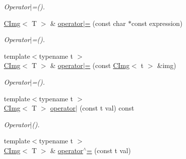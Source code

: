 \begin{DoxyCompactItemize}
\begin{DoxyCompactList}\small\item\em Operator$|$=(). \item\end{DoxyCompactList}\item 
\hypertarget{structcimg__library_1_1CImg_ac742c9e0fcef4bfef80bc8f781ad09fb}{
\hyperlink{structcimg__library_1_1CImg}{CImg}$<$ T $>$ \& \hyperlink{structcimg__library_1_1CImg_ac742c9e0fcef4bfef80bc8f781ad09fb}{operator$|$=} (const char $\ast$const expression)}
\label{structcimg__library_1_1CImg_ac742c9e0fcef4bfef80bc8f781ad09fb}

\begin{DoxyCompactList}\small\item\em Operator$|$=(). \item\end{DoxyCompactList}\item 
\hypertarget{structcimg__library_1_1CImg_a6306b063ce03ecf392a03cac541375af}{
{\footnotesize template$<$typename t $>$ }\\\hyperlink{structcimg__library_1_1CImg}{CImg}$<$ T $>$ \& \hyperlink{structcimg__library_1_1CImg_a6306b063ce03ecf392a03cac541375af}{operator$|$=} (const \hyperlink{structcimg__library_1_1CImg}{CImg}$<$ t $>$ \&img)}
\label{structcimg__library_1_1CImg_a6306b063ce03ecf392a03cac541375af}

\begin{DoxyCompactList}\small\item\em Operator$|$=(). \item\end{DoxyCompactList}\item 
\hypertarget{structcimg__library_1_1CImg_a2f09e5e6e7495d8515ea22806eeae6b2}{
{\footnotesize template$<$typename t $>$ }\\\hyperlink{structcimg__library_1_1CImg}{CImg}$<$ T $>$ \hyperlink{structcimg__library_1_1CImg_a2f09e5e6e7495d8515ea22806eeae6b2}{operator$|$} (const t val) const }
\label{structcimg__library_1_1CImg_a2f09e5e6e7495d8515ea22806eeae6b2}

\begin{DoxyCompactList}\small\item\em Operator$|$(). \item\end{DoxyCompactList}\item 
\hypertarget{structcimg__library_1_1CImg_a6b5cb6b7577c1f9486e13f6262741fbe}{
{\footnotesize template$<$typename t $>$ }\\\hyperlink{structcimg__library_1_1CImg}{CImg}$<$ T $>$ \& \hyperlink{structcimg__library_1_1CImg_a6b5cb6b7577c1f9486e13f6262741fbe}{operator$^\wedge$=} (const t val)}
\label{structcimg__library_1_1CImg_a6b5cb6b7577c1f9486e13f6262741fbe}


\end{DoxyCompactItemize}
